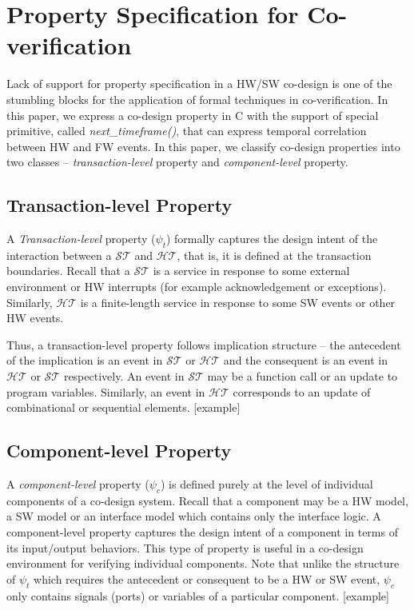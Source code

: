 \documentclass[sigconf]{acmart}
\newcommand{\rmcmt}[1]{{\color{magenta} [{#1}]}}
\begin{document}
\section{Property Specification for Co-verification}\label{property}
Lack of support for property specification in a HW/SW co-design is one of the
stumbling blocks for the application of formal techniques in co-verification.  
In this paper, we express a co-design property in C 
with the support of special primitive, called {\em next\_timeframe()}, 
that can express temporal correlation between HW and FW events. 
In this paper, we classify co-design properties into two 
classes -- {\em transaction-level} property and {\em component-level} property.
\subsection{Transaction-level Property}
A {\em Transaction-level} property ($\psi_{t}$) formally captures the 
design intent of the interaction between a $\mathcal{ST}$ and $\mathcal{HT}$, 
that is, it is defined at the transaction boundaries.  
Recall that a $\mathcal{ST}$ is a service in response to some external environment 
or HW interrupts (for example acknowledgement or exceptions). Similarly, 
$\mathcal{HT}$ is a finite-length service in response to some SW events or 
other HW events. 

Thus, a transaction-level property follows implication structure -- the 
antecedent of the implication is an event in $\mathcal{ST}$ or 
$\mathcal{HT}$ and the consequent is an event in $\mathcal{HT}$ 
or $\mathcal{ST}$ respectively.  An event in $\mathcal{ST}$ may be 
a function call or an update to program variables. Similarly, an event in 
$\mathcal{HT}$ corresponds to an update of combinational or sequential 
elements. \rmcmt{example} 

\subsection{Component-level Property}
A {\em component-level} property ($\psi_{c}$) is defined purely at the 
level of individual components of a co-design system. Recall that a component 
may be a HW model, a SW model or an interface model which contains only the 
interface logic.  A component-level property captures the design intent of a 
component in terms of its input/output behaviors.  This type of property 
is useful in a co-design environment for verifying individual components.   
Note that unlike the structure of $\psi_{t}$ which requires the antecedent 
or consequent to be a HW or SW event,  $\psi_{c}$ only contains signals 
(ports) or variables of a particular component. \rmcmt{example} 
 
\end{document}
